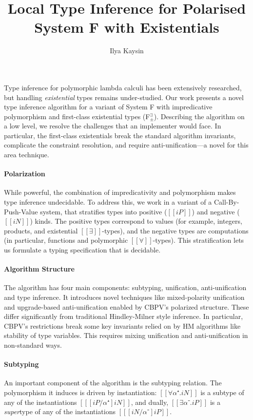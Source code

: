 \documentclass[sigplan,natbib=false,screen]{acmart}
\title{Local Type Inference for Polarised System F with Existentials}
\author{Ilya Kaysin}
\begin{document}
\maketitle

Type inference for polymorphic lambda calculi has been extensively
researched, but handling \emph{existential} types remains under-studied.
Our work presents a novel type inference algorithm for a 
variant of System F with impredicative polymorphism and first-class
existential types (F$_{\pm}^{\exists}$).
Describing the algorithm on a low level, we resolve the challenges that 
an implementer would face. In particular, the first-class existentials 
break the standard algorithm invariants, complicate the constraint resolution,
and require anti-unification---a novel for this area technique.

\paragraph{Polarization}
While powerful, the combination of impredicativity and polymorphism 
makes type inference undecidable. To address this, we work in a variant 
of a Call-By-Push-Value system, that stratifies types into positive ($[[iP]]$) 
and negative ($[[iN]]$) kinds. 
The positive types correspond to values (for example, integers, products, 
and existential $[[∃]]$-types),
and the negative types are computations 
(in particular, functions and polymorphic $[[∀]]$-types).
This stratification lets us formulate a typing specification that is decidable.

\paragraph{Algorithm Structure}
The algorithm has four main components: subtyping, unification, anti-unification
and type inference. It introduces novel techniques like mixed-polarity
unification and upgrade-based anti-unification enabled by CBPV's polarized
structure. These differ significantly from traditional Hindley-Milner style
inference. In particular, CBPV's restrictions break some key invariants relied
on by HM algorithms like stability of type variables. This requires mixing
unification and anti-unification in non-standard ways.




\paragraph{Subtyping}
An important component of the algorithm is the subtyping relation.
The polymorphism it induces is driven by instantiation:
$[[∀α⁺.iN]]$ is a subtype of any of the instantiations $[[ [iP/α⁺]iN]]$,
and dually, $[[∃α⁻.iP]]$ is a \emph{super}type of any of the 
instantiations $[[ [iN/α⁻]iP]]$.
\end{document}
